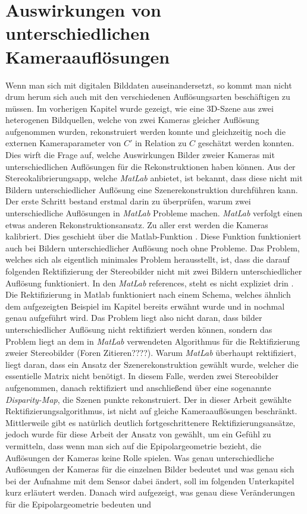 \chapter{Auswirkungen von unterschiedlichen Kameraauflösungen}
\label{sec:minimalAuf} 

Wenn man sich mit digitalen Bilddaten auseinandersetzt, so kommt man nicht drum herum sich auch mit den  verschiedenen Auflösungsarten beschäftigen zu müssen. Im vorherigen Kapitel wurde gezeigt, wie eine 3D-Szene aus zwei heterogenen Bildquellen, welche von zwei Kameras gleicher Auflösung aufgenommen wurden, rekonstruiert werden konnte und gleichzeitig noch die externen Kameraparameter von $C'$ in Relation zu $C$ geschätzt werden konnten. Dies wirft die Frage auf, welche Auswirkungen Bilder zweier Kameras mit unterschiedlichen Auflösungen für die Rekonstruktionen haben können. Aus der Stereokalibrierungsapp, welche \textit{MatLab} anbietet, ist bekannt, dass diese nicht mit Bildern unterschiedlicher Auflösung eine Szenerekonstruktion durchführen kann. Der erste Schritt bestand erstmal darin zu überprüfen, warum zwei unterschiedliche Auflösungen in \textit{MatLab} Probleme machen. \textit{MatLab} verfolgt einen etwas anderen Rekonstruktionsansatz. Zu aller erst werden die Kameras kalibriert. Dies geschieht über die Matlab-Funktion \cite{MatlabCamParam}. Diese Funktion funktioniert auch bei Bildern unterschiedlicher Auflösung noch ohne Probleme. Das Problem, welches sich als eigentlich minimales Problem herausstellt, ist, dass die darauf folgenden Rektifizierung der Stereobilder nicht mit zwei Bildern unterschiedlicher Auflösung funktioniert. In den \textit{MatLab} references, steht es nicht expliziet drin \cite{MatlabRec}. Die Rektifizierung in Matlab funktioniert nach einem Schema, welches ähnlich dem aufgezeigten Beispiel im Kapitel  bereits erwähnt wurde und in \cite{Fusiello,FusielloSite} nochmal genau aufgeführt wird. Das Problem liegt also nicht daran, dass bilder unterschiedlicher Auflösung nicht rektifiziert werden können, sondern das Problem liegt an dem in \textit{MatLab} verwendeten Algorithmus für die Rektifizierung zweier Stereobilder (Foren Zitieren????). Warum \textit{MatLab} überhaupt rektifiziert, liegt daran, dass ein Ansatz der Szenerekonstruktion gewählt wurde, welcher die essentielle Matrix nicht benötigt. In diesem Falle, werden zwei Stereobilder aufgenommen, danach rektifiziert und anschließend über eine sogenannte \textit{Disparity-Map}, die Szenen punkte rekonstruiert\cite{MatlabDisp,MatlabStereoApp,Fusiello,Javier}. Der in dieser Arbeit gewählte Rektifizierungsalgorithmus, ist nicht auf gleiche Kameraauflösungen beschränkt. Mittlerweile gibt es natürlich deutlich fortgeschrittenere Rektifizierungsansätze, jedoch wurde für diese Arbeit der Ansatz von \cite{ZZ} gewählt, um ein Gefühl zu vermitteln, dass wenn man sich auf die Epipolargeometrie bezieht, die Auflösungen der Kameras keine Rolle spielen\cite{Elements}. Was genau unterschiedliche Auflösungen der Kameras für die einzelnen Bilder bedeutet und was genau sich bei der Aufnahme mit dem Sensor dabei ändert, soll im folgenden Unterkapitel kurz erläutert werden. Danach wird aufgezeigt, was genau diese Veränderungen für die Epipolargeometrie bedeuten und 